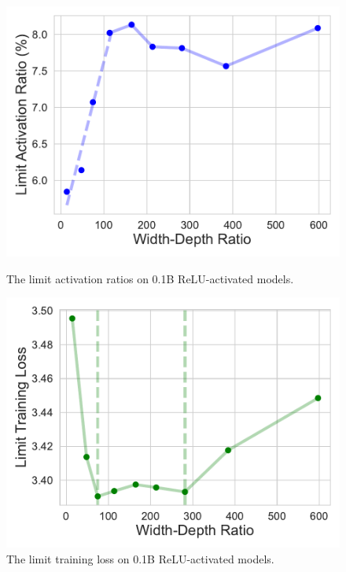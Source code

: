 \documentclass{article} %
\begin{document}
\begin{figure}[ht]
\begin{minipage}[c]{0.48\linewidth}
    \centering
    \includegraphics[width=\linewidth]{figures/act_ratio.pdf}
    \caption{The limit activation ratios on 0.1B ReLU-activated models.}
    \label{fig:act-width-ratio}
\end{minipage}
\hfill
\begin{minipage}[c]{0.48\linewidth}
    \centering
    \includegraphics[width=\linewidth]{figures/loss_ratio.pdf}
    \caption{The limit training loss on 0.1B ReLU-activated models.}
    \label{fig:loss-width-ratio}
\end{minipage}
\vspace{-1em}
\end{figure}
\end{document}
